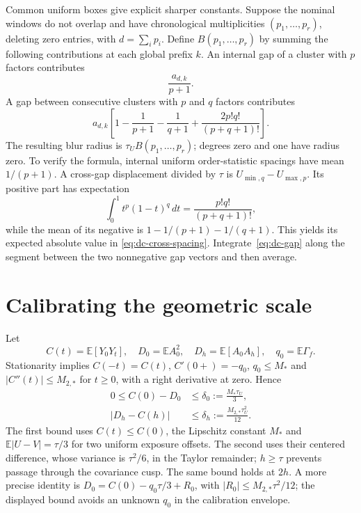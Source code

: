 Common uniform boxes give explicit sharper constants.  Suppose the nominal
windows do not overlap and have chronological multiplicities
$(p_1,\ldots,p_r)$, deleting zero entries, with $d=\sum_i p_i$.  Define
$B(p_1,\ldots,p_r)$ by summing the following contributions at each global
prefix $k$.  An internal gap of a cluster with $p$ factors contributes
\begin{equation}
 \frac{a_{d,k}}{p+1}.
 \label{eq:dc-internal-spacing}
\end{equation}
A gap between consecutive clusters with $p$ and $q$ factors contributes
\begin{equation}
 a_{d,k}\left[1-\frac1{p+1}-\frac1{q+1}
                  +\frac{2p!q!}{(p+q+1)!}\right].
 \label{eq:dc-cross-spacing}
\end{equation}
The resulting blur radius is $\tau_U B(p_1,\ldots,p_r)$; degrees zero and
one have radius zero.  To verify the formula, internal uniform order-statistic
spacings have mean $1/(p+1)$.  A cross-gap displacement divided by $\tau$ is
$U_{\min,q}-U_{\max,p}$.  Its positive part has expectation
\[
 \int_0^1t^p(1-t)^q\,dt=\frac{p!q!}{(p+q+1)!},
\]
while the mean of its negative is
$1-1/(p+1)-1/(q+1)$.  This yields its expected absolute value in
\eqref{eq:dc-cross-spacing}.  Integrate~\eqref{eq:dc-gap} along the segment
between the two nonnegative gap vectors and then average.

\section{Calibrating the geometric scale}

Let
\[
 C(t)=\mathbb E[Y_0Y_t],\quad D_0=\mathbb E A_0^2,\quad
 D_h=\mathbb E[A_0A_h],\quad q_0=\mathbb E\Gamma_f.
\]
Stationarity implies $C(-t)=C(t)$, $C'(0+)=-q_0$, $q_0\le M_*$ and
$|C''(t)|\le M_{2,*}$ for $t\ge0$, with a right derivative at zero.  Hence
\begin{align}
 0\le C(0)-D_0&\le\delta_0:=\frac{M_*\tau_U}{3},\\
 |D_h-C(h)|&\le\delta_h:=\frac{M_{2,*}\tau_U^2}{12}.
 \label{eq:dc-covariance-blur}
\end{align}
The first bound uses $C(t)\le C(0)$, the Lipschitz constant $M_*$ and
$\mathbb E|U-V|=\tau/3$ for two uniform exposure offsets.  The second uses
their centered difference, whose variance is $\tau^2/6$, in the Taylor
remainder; $h\ge\tau$ prevents passage through the covariance cusp.  The
same bound holds at $2h$.  A more precise identity is
$D_0=C(0)-q_0\tau/3+R_0$, with $|R_0|\le M_{2,*}\tau^2/12$; the displayed
bound avoids an unknown $q_0$ in the calibration envelope.

